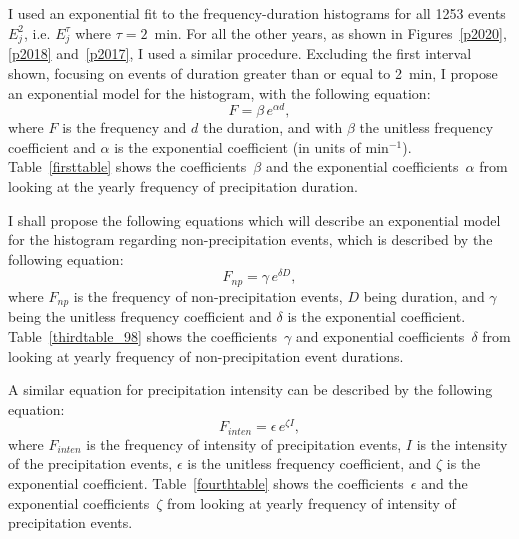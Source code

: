 \documentclass[11pt]{report}
\begin{document}
I used an exponential fit to the frequency-duration histograms for all 1253
events $E_j^2$, i.e. $E_j^\tau$ where $\tau=2$~min. For all the other years,
as shown in Figures~\ref{p2020}, \ref{p2018} and~\ref{p2017}, I used a
similar procedure. Excluding the first interval shown, focusing on events of
duration greater than or equal to 2~min, I propose an exponential model for
the histogram, with the following equation:
\begin{equation}\label{expod}
  F = \beta \,e^{\alpha d},
\end{equation}
where $F$ is the frequency and $d$ the duration, and with $\beta$ the
unitless frequency coefficient and $\alpha$ is the exponential coefficient
(in units of min$^{-1}$). Table~\ref{firsttable} shows the
coefficients~$\beta$ and the exponential coefficients~$\alpha$ from looking
at the yearly frequency of precipitation duration.

I shall propose the following equations which will describe an
exponential model for the histogram regarding non-precipitation events,
which is described by the following equation:
\begin{equation}\label{expod_np}
	F_{np} = \gamma \,e^{\delta D},
\end{equation}
where $F_{np}$ is the frequency of non-precipitation events, $D$ being
duration, and $\gamma $ being the unitless frequency coefficient and
$\delta$ is the exponential coefficient. Table~\ref{thirdtable_98} shows the
coefficients~$\gamma$ and exponential coefficients~$\delta$ from looking at
yearly frequency of non-precipitation event durations.

A similar equation for precipitation intensity can be described by the
following equation:
\begin{equation}\label{expod_inten}
  F_{inten} = \epsilon \,e^{\zeta I},
\end{equation}
where $F_{inten}$ is the frequency of intensity of precipitation events, $I$
is the intensity of the precipitation events, $\epsilon$ is the unitless
frequency coefficient, and $\zeta$ is the exponential
coefficient. Table~\ref{fourthtable} shows the coefficients~$\epsilon$ and
the exponential coefficients~$\zeta$ from looking at yearly frequency of
intensity of precipitation events.
\end{document}
